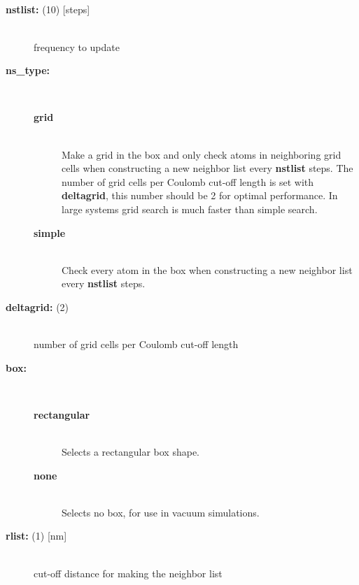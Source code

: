 \subsection{}
\begin{description}
\item[{\bf nstlist: }(10) {[steps]}]\mbox{}\\
frequency to update 
\item[{\bf ns\_type:}]\mbox{}\\
\vspace{-2ex}\begin{description}
\item[{\bf grid}]\mbox{}\\
Make a grid in the box and only check atoms in neighboring grid
cells when constructing a new neighbor list every {\bf nstlist} steps.
The number of grid cells per Coulomb cut-off
length is set with {\bf deltagrid}, this number should be 2 for
optimal performance.  In large systems grid search is much faster than
simple search.
\item[{\bf simple}]\mbox{}\\
Check every atom in the box when constructing a new neighbor list
every {\bf nstlist} steps.
\end{description}
\item[{\bf deltagrid: }(2)]\mbox{}\\
number of grid cells per Coulomb cut-off length
\item[{\bf box:}]\mbox{}\\
\vspace{-2ex}\begin{description}
\item[{\bf rectangular}]\mbox{}\\
Selects a rectangular box shape.
\item[{\bf none}]\mbox{}\\
Selects no box, for use in vacuum simulations.
\end{description}
\item[{\bf rlist: }(1) {[nm]}]\mbox{}\\
cut-off distance for making the neighbor list
\end{description}

